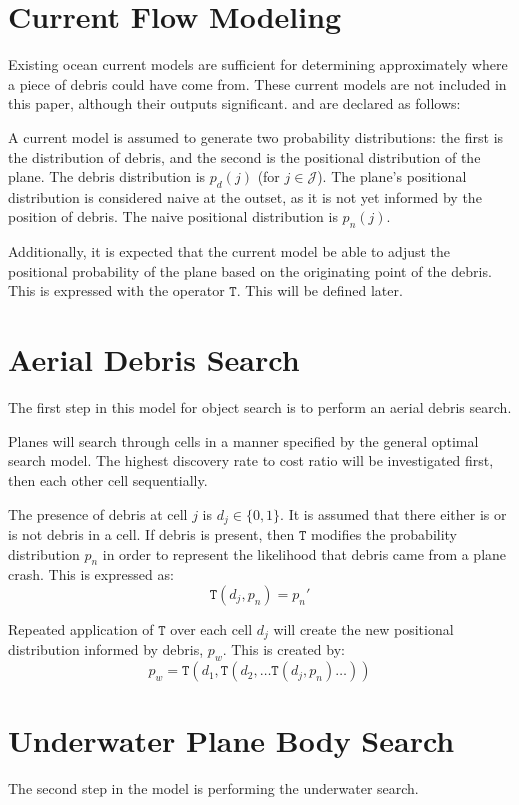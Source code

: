 \documentclass[a4paper]{article}
\begin{document}


\section{Current Flow Modeling}

Existing ocean current models are sufficient for determining approximately where a piece of debris could have come from. These current models are not included in this paper, although their outputs significant. and are declared as follows:

A current model is assumed to generate two probability distributions: the first is the distribution of debris, and the second is the positional distribution of the plane. The debris distribution is $p_d(j)$ (for $j\in\mathcal{J}$). The plane's positional distribution is considered naive at the outset, as it is not yet informed by the position of debris. The naive positional distribution is $p_n(j)$. 

Additionally, it is expected that the current model be able to adjust the positional probability of the plane based on the originating point of the debris. This is expressed with the operator $\mathtt{T}$. This will be defined later. 

\section{Aerial Debris Search}

The first step in this model for object search is to perform an aerial debris search. 

Planes will search through cells in a manner specified by the general optimal search model. The highest discovery rate to cost ratio will be investigated first, then each other cell sequentially.

The presence of debris at cell $j$ is $d_j\in \{0,1\}$. It is assumed that there either is or is not debris in a cell. If debris is present, then $\mathtt{T}$ modifies the probability distribution $p_n$ in order to represent the likelihood that debris came from a plane crash. This is expressed as: $$\mathtt{T}(d_j,p_n)=p_n'$$

Repeated application of $\mathtt{T}$ over each cell $d_j$ will create the new positional distribution informed by debris, $p_w$. This is created by: $$p_w=\mathtt{T}(d_1, \mathtt{T}(d_2, \ldots \mathtt{T}(d_j, p_n)\ldots))$$

\section{Underwater Plane Body Search}
The second step in the model is performing the underwater search. 
\end{document}

